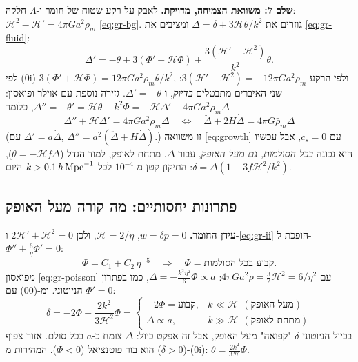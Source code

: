 \textbf{שלב 7: משוואת הצמיחה, מדויקת.} לאבק על רקע שטוח של חומר ו-$\Lambda$ חלקה: $\mathcal H^2-\mathcal H'=4\pi Ga^2\rho_m$ \eqref{eq:gr-bg}. גוזרים את $\Delta=\delta+3\mathcal H\theta/k^2$ ומציבים את \eqref{eq:gr-fluid}:
\begin{equation}
\Delta'=-\theta+3(\Phi'+\mathcal H\Phi)+\frac{3(\mathcal H'-\mathcal H^2)}{k^2}\theta .
\end{equation}
לפי (0i) $3(\Phi'+\mathcal H\Phi)=12\pi Ga^2\rho_m\theta/k^2$, ולפי הרקע $3(\mathcal H'-\mathcal H^2)=-12\pi Ga^2\rho_m$: שני האיברים מתבטלים \emph{בדיוק}, ו-$\Delta'=-\theta$. גזירה נוספת עם אוילר ופואסון:
$\Delta''=-\theta'=\mathcal H\theta-k^2\Phi=-\mathcal H\Delta'+4\pi Ga^2\rho_m\Delta$, כלומר
\begin{equation}
\boxed{\;\Delta''+\mathcal H\Delta'=4\pi Ga^2\rho_m\Delta\quad\Longleftrightarrow\quad\ddot\Delta+2H\dot\Delta=4\pi G\bar\rho_m\Delta\;}
\label{eq:gr-growth}
\end{equation}
(עם $\Delta'=a\dot\Delta$, $\Delta''=a^2(\ddot\Delta+H\dot\Delta)$.) זו משוואה \eqref{eq:growth} עם $c_s=0$, אבל עכשיו היא נכונה \emph{בכל הסולמות, גם מעל האופק}, עבור $\Delta$. מתחת לאופק, למוד הגדל ($\theta=-\mathcal Hf\Delta$), $\delta=\Delta(1+3f\mathcal H^2/k^2)$: התיקון קטן מ-$10^{-4}$ לכל $k>0.1\,h\,\mathrm{Mpc}^{-1}$ היום.

\subsection{פתרונות יחסותיים: מה קורה מעל האופק}
\textbf{עידן החומר.} $w=\delta p=0$, $\mathcal H=2/\eta$, ולכן $2\mathcal H'+\mathcal H^2=0$ ו-\eqref{eq:gr-ii} הופכת ל-$\Phi''+\frac6\eta\Phi'=0$:
\begin{equation}
\Phi=C_1+C_2\,\eta^{-5}\quad\Longrightarrow\quad\boxed{\Phi=\text{קבוע בכל הסולמות}} .
\end{equation}
מפואסון \eqref{eq:gr-poisson} עם $4\pi Ga^2\rho=\tfrac32\mathcal H^2=6/\eta^2$: $\Delta=-\frac{k^2\eta^2}{6}\Phi\propto a$, כמו בפתרון הניוטוני. ומ-(00) עם $\Phi'=0$:
\begin{equation}
\delta=-2\Phi-\frac{2k^2}{3\mathcal H^2}\Phi=
\begin{cases}-2\Phi=\text{קבוע}, & k\ll\mathcal H\ \ (\text{מעל האופק})\\[2pt] \Delta\propto a, & k\gg\mathcal H\ \ (\text{מתחת לאופק})\end{cases}
\end{equation}
בכיול הניוטוני $\delta$ "קפואה" מעל האופק, אבל זה אפקט כיול: $\Delta$ צומח כ-$a$ בכל סולם. אזור צפוף ($\delta>0$) הוא בור פוטנציאל ($\Phi<0$). המהירות מ-(0i): $\theta=\frac{2k^2}{3\mathcal H}\Phi$.

